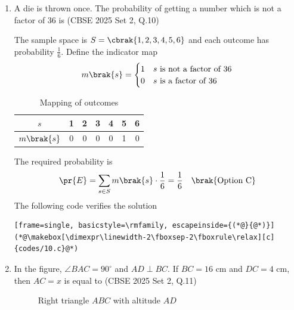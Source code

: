\begin{enumerate}[label=\thesubsection.\arabic*, ref=\thesubsection.\theenumi]
\item
A die is thrown once. The probability of getting a number which is not a factor of $36$ is
\hfill (CBSE 2025 Set 2, Q.10)
\begin{enumerate}
	\begin{multicols}{4}
    \item $\frac{1}{2}$
    \item $\frac{2}{3}$
    \item $\frac{1}{6}$
    \item $\frac{5}{6}$
	\end{multicols}
\end{enumerate}

\solution
The sample space is $S = \cbrak{1,2,3,4,5,6}$ and each outcome has probability $\frac{1}{6}$. Define the indicator map
\begin{align}
	m\brak{s} =
	\begin{cases}
		1 & s \text{ is not a factor of } 36 \\
		0 & s \text{ is a factor of } 36
	\end{cases}
\end{align}
\begin{table}[H]
	\centering
	\begin{tabular}{|c|c|c|c|c|c|c|}
		\hline
		$s$ & 1 & 2 & 3 & 4 & 5 & 6 \\ \hline
		$m\brak{s}$ & 0 & 0 & 0 & 0 & 1 & 0 \\ \hline
	\end{tabular}
	\caption{Mapping of outcomes}
	\label{tab:CBSE25S2-q10}
\end{table}
The required probability is
\begin{align}
	\pr{E} = \sum_{s \in S} m\brak{s} \cdot \frac{1}{6} = \frac{1}{6} \quad \brak{\text{Option C}}
\end{align}
The following code verifies the solution
\begin{lstlisting}[frame=single, basicstyle=\rmfamily, escapeinside={(*@}{@*)}]
(*@\makebox[\dimexpr\linewidth-2\fboxsep-2\fboxrule\relax][c]{codes/10.c}@*)
\end{lstlisting}

\item
In the figure, $\angle BAC = 90^\circ$ and $AD \perp BC$. If $BC = 16$ cm and $DC = 4$ cm, then $AC = x$ is equal to
\hfill (CBSE 2025 Set 2, Q.11)
\begin{enumerate}
\end{enumerate}
\begin{figure}[H]
	\centering

	\caption{Right triangle $ABC$ with altitude $AD$}
	\label{fig:CBSE25S2-q11}
\end{figure}


\end{enumerate}
